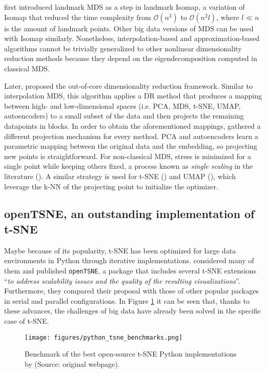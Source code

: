 \citet{Silva2002} first introduced landmark MDS as a step in landmark Isomap, a variation of Isomap that reduced the time complexity from $\mathcal{O}(n^3)$ to $\mathcal{O}(n^2l)$, where $l \ll n$ is the amount of landmark points. Other big data versions of MDS can be used with Isomap similarly. Nonetheless, interpolation-based and approximation-based algorithms cannot be trivially generalized to other nonlinear dimensionality reduction methods because they depend on the eigendecomposition computed in classical MDS.

Later, \citet{Reichmann2024} proposed the out-of-core dimensionality reduction framework. Similar to interpolation MDS, this algorithm applies a DR method that produces a mapping between high- and low-dimensional spaces (i.e. PCA, MDS, t-SNE, UMAP, autoencoders) to a small subset of the data and then projects the remaining datapoints in blocks. In order to obtain the aforementioned mappings, \citet{Reichmann2024} gathered a different projection mechanism for every method. PCA and autoencoders learn a parametric mapping between the original data and the embedding, so projecting new points is straightforward. For non-classical MDS, stress is minimized for a single point while keeping others fixed, a process known as \textit{single scaling} in the literature (\cite{Basalaj1999}). A similar strategy is used for t-SNE (\cite{Zhang2021}) and UMAP (\cite{McInnes2018a}), which leverage the k-NN of the projecting point to initialize the optimizer.

\subsection{openTSNE, an outstanding implementation of t-SNE}
\label{sec:openTSNE}

Maybe because of its popularity, t-SNE has been optimized for large data environments in Python through iterative implementations. \citet{Policar2024} considered many of them and published \verb|openTSNE|, a package that includes several t-SNE extensions \enquote{\textit{to address scalability issues and the quality of the resulting visualizations}}. Furthermore, they compared their proposal with those of other popular packages in serial and parallel configurations. In Figure \ref{fig:python_tsne_benchmarks} it can be seen that, thanks to these advances, the challenges of big data have already been solved in the specific case of t-SNE.

\begin{figure}
    \centering
    \texttt{[image: figures/python\_tsne\_benchmarks.png]}
    \caption{Benchmark of the best open-source t-SNE Python implementations by \citet{Poličar2023} (Source: original webpage).}
    \label{fig:python_tsne_benchmarks}
\end{figure}